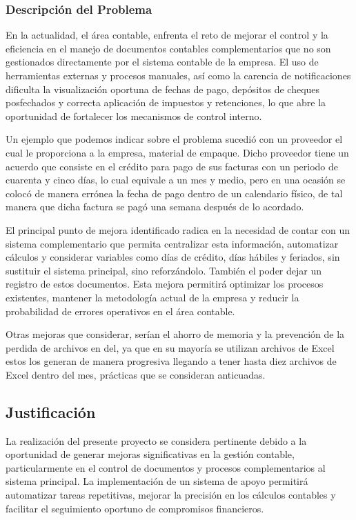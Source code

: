 \subsubsection{Descripción del Problema}

En la actualidad, el área contable, enfrenta el reto de mejorar el control y la eficiencia en el manejo de documentos contables complementarios que no son gestionados directamente por el sistema contable de la empresa. El uso de herramientas externas y procesos manuales, así como la carencia de notificaciones dificulta la visualización oportuna de fechas de pago, depósitos de cheques posfechados y correcta aplicación de impuestos y retenciones, lo que abre la oportunidad de fortalecer los mecanismos de control interno.

Un ejemplo que podemos indicar sobre el problema sucedió con un proveedor el cual le proporciona a la empresa, material de empaque. Dicho proveedor tiene un acuerdo que consiste en el crédito para pago de sus facturas con un periodo de cuarenta y cinco días, lo cual equivale a un mes y medio, pero en una ocasión se colocó de manera errónea la fecha de pago dentro de un calendario físico, de tal manera que dicha factura se pagó una semana después de lo acordado.

El principal punto de mejora identificado radica en la necesidad de contar con un sistema complementario que permita centralizar esta información, automatizar cálculos y considerar variables como días de crédito, días hábiles y feriados, sin sustituir el sistema principal, sino reforzándolo. También el poder dejar un registro de estos documentos. Esta mejora permitirá optimizar los procesos existentes, mantener la metodología actual de la empresa y reducir la probabilidad de errores operativos en el área contable.

Otras mejoras que considerar, serían el ahorro de memoria y la prevención de la perdida de archivos en del, ya que en su mayoría se utilizan archivos de Excel estos los generan de manera progresiva llegando a tener hasta diez archivos de Excel dentro del mes, prácticas que se consideran anticuadas.

\subsection{Justificación}

La realización del presente proyecto se considera pertinente debido a la oportunidad de generar mejoras significativas en la gestión contable, particularmente en el control de documentos y procesos complementarios al sistema principal. La implementación de un sistema de apoyo permitirá automatizar tareas repetitivas, mejorar la precisión en los cálculos contables y facilitar el seguimiento oportuno de compromisos financieros.

